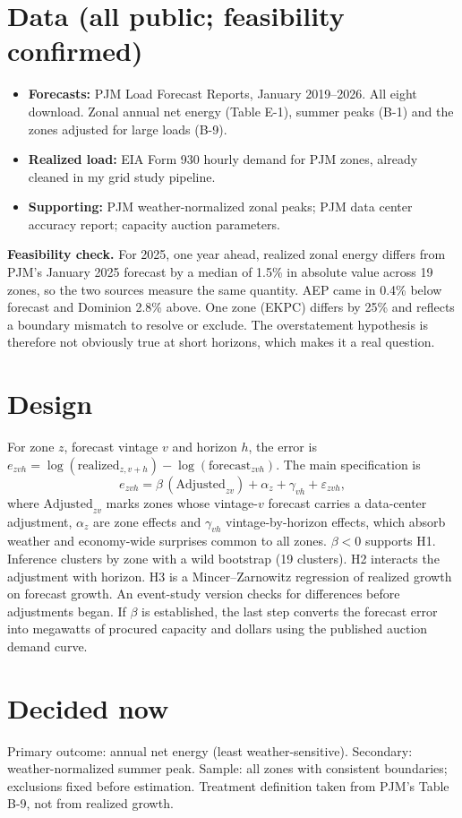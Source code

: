 \documentclass[10pt,a4paper]{article}
\begin{document}
\section{Data (all public; feasibility confirmed)}
\begin{itemize}
\item \textbf{Forecasts:} PJM Load Forecast Reports, January 2019--2026. All eight download. Zonal annual net energy (Table E-1), summer peaks (B-1) and the zones adjusted for large loads (B-9).
\item \textbf{Realized load:} EIA Form 930 hourly demand for PJM zones, already cleaned in my grid study pipeline.
\item \textbf{Supporting:} PJM weather-normalized zonal peaks; PJM data center accuracy report; capacity auction parameters.
\end{itemize}
\textbf{Feasibility check.} For 2025, one year ahead, realized zonal energy differs from PJM's January 2025 forecast by a median of 1.5\% in absolute value across 19 zones, so the two sources measure the same quantity. AEP came in 0.4\% below forecast and Dominion 2.8\% above. One zone (EKPC) differs by 25\% and reflects a boundary mismatch to resolve or exclude. The overstatement hypothesis is therefore not obviously true at short horizons, which makes it a real question.

\section{Design}
For zone $z$, forecast vintage $v$ and horizon $h$, the error is $e_{zvh} = \log(\text{realized}_{z,v+h}) - \log(\text{forecast}_{zvh})$. The main specification is
\[ e_{zvh} = \beta\,(\text{Adjusted}_{zv}) + \alpha_z + \gamma_{vh} + \varepsilon_{zvh}, \]
where $\text{Adjusted}_{zv}$ marks zones whose vintage-$v$ forecast carries a data-center adjustment, $\alpha_z$ are zone effects and $\gamma_{vh}$ vintage-by-horizon effects, which absorb weather and economy-wide surprises common to all zones. $\beta<0$ supports H1. Inference clusters by zone with a wild bootstrap (19 clusters). H2 interacts the adjustment with horizon. H3 is a Mincer--Zarnowitz regression of realized growth on forecast growth. An event-study version checks for differences before adjustments began. If $\beta$ is established, the last step converts the forecast error into megawatts of procured capacity and dollars using the published auction demand curve.

\section{Decided now}
Primary outcome: annual net energy (least weather-sensitive). Secondary: weather-normalized summer peak. Sample: all zones with consistent boundaries; exclusions fixed before estimation. Treatment definition taken from PJM's Table B-9, not from realized growth.
\end{document}
